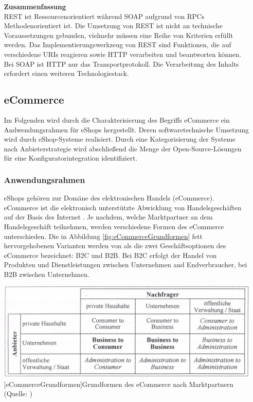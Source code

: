 \documentclass[11pt, a4paper, titlepage, listof=totoc, bibliography=totoc, index=totoc, twoside, openright, headings=normal]{scrreprt}
\begin{document}
\textbf{Zusammenfassung}\\
REST ist Ressourcenorientiert während SOAP aufgrund von \ac{RPC}s Methodenorientiert ist. Die Umsetzung von REST ist nicht an technische Voraussetzungen gebunden, vielmehr müssen eine Reihe von Kriterien erfüllt werden. Das Implementierungswerkzeug von REST sind Funktionen, die auf verschiedene URIs reagieren sowie HTTP verarbeiten und beantworten können. Bei SOAP ist HTTP nur das Transportprotokoll. Die Verarbeitung des Inhalts erfordert einen weiteren Technologiestack.

\subsection{eCommerce}

Im Folgenden wird durch die Charakterisierung des Begriffs eCommerce ein Andwendungsrahmen für eShops hergestellt. Deren softwaretechnische Umsetzung wird durch eShop-Systeme realisiert. Durch eine Kategorisierung der Systeme nach Anbieterstrategie wird abschließend die Menge der Open-Source-Lösungen für eine Konfiguratorintegration identifiziert.

\subsubsection{Anwendungsrahmen}
eShops gehören zur Domäne des elektronischen Handels (eCommerce). eCommerce ist \glqq die elektronisch unterstützte Abwicklung von Handelsgeschäften auf der Basis des Internet\grqq{} \citep{schwarze02}. Je nachdem, welche Marktpartner an dem Handelsgeschäft teilnehmen, werden verschiedene Formen des eCommerce unterschieden. Die in Abbildung \ref{fig:eCommerceGrundformen} fett hervorgehobenen Varianten werden von \citet{meier12} als \glqq die zwei Geschäftsoptionen des eCommerce\grqq{} bezeichnet: \ac{B2C} und \ac{B2B}. Bei \ac{B2C} erfolgt der Handel von Produkten und Dienstleistungen zwischen Unternehmen and Endverbraucher, bei \ac{B2B} zwischen Unternehmen.

\vspace{1em}
\begin{minipage}{\linewidth}
	\centering
	\includegraphics[width=0.7\linewidth]{Abbildungen/eCommerceGrundformen.png}
	[eCommerceGrundformen]{Grundformen des eCommerce nach Marktpartnern (Quelle: \citet{schwarze02})}
	\label{fig:eCommerceGrundformen}
\end{minipage}
\vspace{1em}
\end{document}
